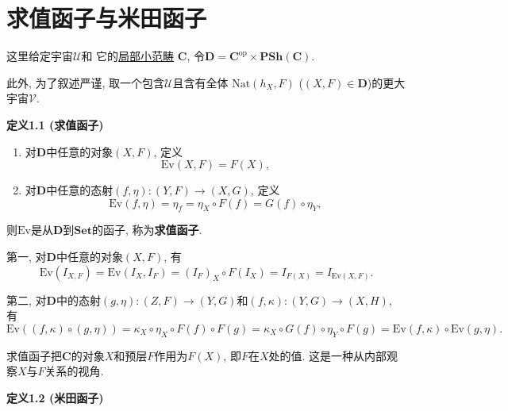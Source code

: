 \documentclass[UTF8]{ctexart}
\begin{document}
\setlength{\abovedisplayskip}{1pt}
\setlength{\belowdisplayskip}{1pt}

\section{求值函子与米田函子}

这里给定宇宙$\mathcal{U}$和
它的\href{../01 范畴、函子与自然变换/01 范畴#nameddest=sec:定义1.2}{局部小范畴}
$\mathbf{C}$, 令$\mathbf{D}=\mathbf{C}^{\mathrm{op}}\times\mathbf{PSh}(\mathbf{C})$.

此外, 为了叙述严谨, 取一个包含$\mathcal{U}$且含有全体
$\mathrm{Nat}(h_X,F)$ ($(X,F)\in\mathbf{D}$)的更大宇宙$\mathcal{V}$.

\vspace{10pt}

\hypertarget{sec:定义1.1}{}
\noindent\textbf{定义1.1 (求值函子)}

\begin{enumerate}
    \item 对$\mathbf{D}$中任意的对象$(X,F)$, 定义
    \[
        \mathrm{Ev}(X,F)=F(X),
    \]
    \item 对$\mathbf{D}$中任意的态射$(f,\eta):(Y,F)\to(X,G)$, 定义
    \[
        \mathrm{Ev}(f,\eta)=\eta_f=\eta_X\circ F(f)=G(f)\circ\eta_Y,
    \]
\end{enumerate}
则$\mathrm{Ev}$是从$\mathbf{D}$到$\mathbf{Set}$的函子, 称为\textbf{求值函子}.


第一, 对$\mathbf{D}$中任意的对象$(X,F)$, 有
\[
    \mathrm{Ev}(I_{X,F})=\mathrm{Ev}(I_X,I_F)=(I_F)_X\circ F(I_X)=
    I_{F(X)}=I_{\mathrm{Ev}(X,F)}.
\]

第二, 对$\mathbf{D}$中的态射$(g,\eta):(Z,F)\to(Y,G)$和$(f,\kappa):(Y,G)\to(X,H)$, 有
\begin{equation*}
    \mathrm{Ev}((f,\kappa)\circ(g,\eta))
    =\kappa_X\circ\eta_X\circ F(f)\circ F(g)
    =\kappa_X\circ G(f)\circ\eta_Y\circ F(g)
    =\mathrm{Ev}(f,\kappa)\circ\mathrm{Ev}(g,\eta).
\tag*{\qedsymbol}\end{equation*}

\vspace{10pt}

求值函子把$\mathbf{C}$的对象$X$和预层$F$作用为$F(X)$,
即$F$在$X$处的值. 这是一种从内部观察$X$与$F$关系的视角.
\vspace{10pt}

\hypertarget{sec:定义1.2}{}
\noindent\textbf{定义1.2 (米田函子)}
\end{document}

